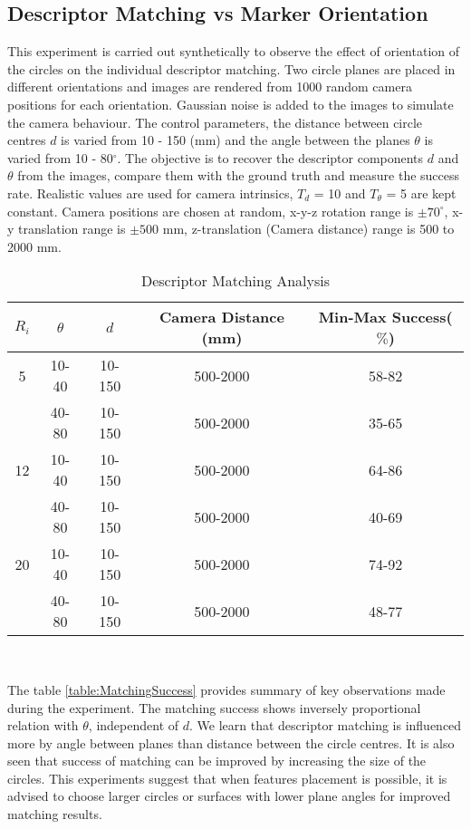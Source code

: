 \documentclass{bmvc2k}
\begin{document}
\subsection{Descriptor Matching vs Marker Orientation}
This experiment is carried out synthetically to observe the effect of orientation of the circles on the individual descriptor matching.
Two circle planes are placed in different orientations and images are rendered from 1000 random camera positions for each orientation. Gaussian noise is added to the images to simulate the camera behaviour. 
The control parameters, the distance between circle centres $ d $ is varied from 10 - 150 (mm) and the angle between the planes $ \theta $ is varied from 10 - 80$ ^\circ $. 
The objective is to recover the descriptor components $ d $ and $ \theta $ from the images, compare them with the ground truth and measure the success rate. 
Realistic values are used for camera intrinsics, $ T_{d} $ = 10 and $ T_\theta $ = 5 are kept constant. 
Camera positions are chosen at random, x-y-z rotation range is $ \pm 70^\circ $, x-y translation range is $ \pm 500 $ mm, z-translation (Camera distance) range is 500 to 2000 mm. 

\begin{table}[tb]
\centering
\caption{Descriptor Matching Analysis } \label{table:MatchingSuccess}
\begin{tabular}{|c | c | c | c | c |}
\hline
$ R_i $ & $ \theta $ & $ d $ & Camera Distance (mm) & Min-Max Success($ \% $) \\ \hline
5 & 10-40 & 10-150 & 500-2000 & 58-82 \\
 {}& 40-80 & 10-150 & 500-2000 & 35-65 \\ \hline
12 & 10-40 & 10-150 & 500-2000 & 64-86 \\
{}& 40-80 & 10-150& 500-2000 & 40-69 \\ \hline
 20 & 10-40 & 10-150 & 500-2000 & 74-92 \\
{} & 40-80 & 10-150 & 500-2000  & 48-77 \\ \hline 
\end{tabular} \\
\label{tab:Exp1}
\end{table}
The table \ref{table:MatchingSuccess} provides summary of key observations made during the experiment. 
The matching success shows inversely proportional relation with $ \theta $, independent of $ d $. 
We learn that descriptor matching is influenced more by angle between planes than distance between the circle centres. 
It is also seen that success of matching can be improved by increasing the size of the circles. 
This experiments suggest that when features placement is possible, it is advised to choose larger circles or surfaces with lower plane angles for improved matching results. 
\end{document}
